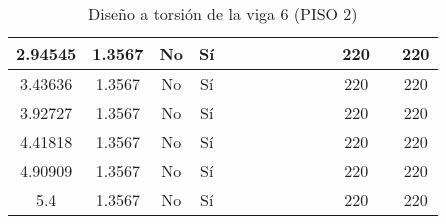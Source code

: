 \begin{table}[H]
{\begin{tabular}{|c|c|c|c|c|c|c|c|c|c|c|c|c|c|}
\hline
2.94545 & 1.3567 & No  & Sí  &     &     &     &     &     &     &     & 220 &     & 220 \bigstrut\\
\hline
3.43636 & 1.3567 & No  & Sí  &     &     &     &     &     &     &     & 220 &     & 220 \bigstrut\\
\hline
3.92727 & 1.3567 & No  & Sí  &     &     &     &     &     &     &     & 220 &     & 220 \bigstrut\\
\hline
4.41818 & 1.3567 & No  & Sí  &     &     &     &     &     &     &     & 220 &     & 220 \bigstrut\\
\hline
4.90909 & 1.3567 & No  & Sí  &     &     &     &     &     &     &     & 220 &     & 220 \bigstrut\\
\hline
5.4 & 1.3567 & No  & Sí  &     &     &     &     &     &     &     & 220 &     & 220 \bigstrut\\
\hline
\end{tabular}%

%
  }
      \caption{Diseño a torsión de la viga 6 (PISO 2) }
  \label{tab:T VG6 P2 }%
\end{table}%
